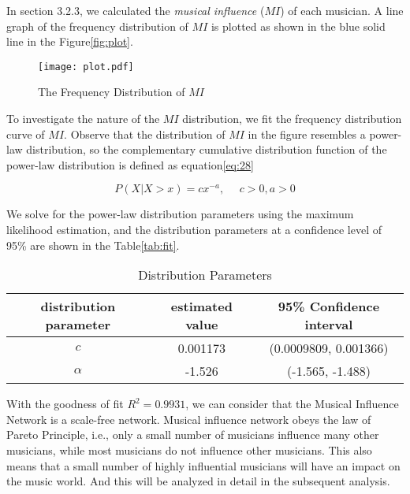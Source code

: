 \documentclass[12pt]{article}  %
\newenvironment{shrinkeq}[1]
{ \bgroup
	\addtolength\abovedisplayshortskip{#1}
	\addtolength\abovedisplayskip{#1}
	\addtolength\belowdisplayshortskip{#1}
	\addtolength\belowdisplayskip{#1}}
{\egroup\ignorespacesafterend}
\begin{document}
In section 3.2.3, we calculated the \emph{musical influence} ($MI$) of each musician. A line graph of the frequency distribution of $MI$ is plotted as shown in the blue solid line in the Figure\eqref{fig:plot}.
\vspace{-0.2cm}
\begin{figure}[htbp]
	\centering
	\texttt{[image: plot.pdf]}
	\caption{The Frequency Distribution of $MI$}\label{fig:plot}
\end{figure}

To investigate the nature of the $MI$ distribution, we fit the frequency distribution curve of $MI$. Observe that the distribution of $MI$ in the figure resembles a power-law distribution, so the complementary cumulative distribution function of the power-law distribution is defined as equation\eqref{eq:28}

\begin{shrinkeq}{-1.5ex}
	\begin{equation}\label{eq:28}
	P(X|X>x)=cx^{-a},\ \ \ \ \ \ c>0,a>0
	\end{equation}
\end{shrinkeq}

We solve for the power-law distribution parameters using the maximum likelihood estimation, and the distribution parameters at a confidence level of 95\% are shown in the Table\eqref{tab:fit}.

\begin{table}[htbp]
	\centering
	\caption{Distribution Parameters}
	\begin{tabular}{c|c|c}
		\hline
		\hline
		\textbf{distribution parameter} & \textbf{estimated value} & \textbf{95\% Confidence interval} \\
		\hline
		\hline
		$c$                    & 0.001173             & (0.0009809, 0.001366) \\
		\hline
		$\alpha$ & -1.526               & (-1.565, -1.488) \\
		\hline
		\hline
	\end{tabular}%
	\label{tab:fit}%
\end{table}%

With the goodness of fit $R^2=0.9931$, we can consider that the Musical Influence Network is a scale-free network. Musical influence network obeys the law of Pareto Principle, i.e., only a small number of musicians influence many other musicians, while most musicians do not influence other musicians. This also means that a small number of highly influential musicians will have an impact on the music world. And this will be analyzed in detail in the subsequent analysis.
\vspace{-0.5cm}
\end{document}
